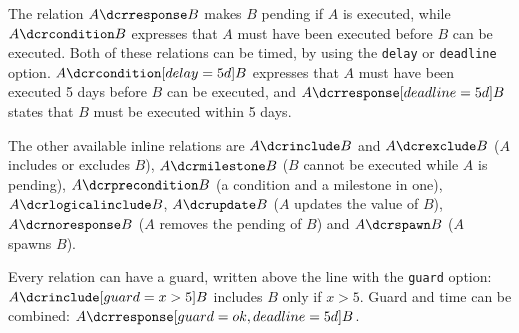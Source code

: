 The relation $A \dcrresponse B$ makes $B$ pending if $A$ is executed,
while $A \dcrcondition B$ expresses that $A$ must have been executed
before $B$ can be executed. Both of these relations can be timed, by
using the \texttt{delay} or \texttt{deadline} option.
$A \dcrcondition[delay=5d] B$ expresses that $A$ must have been executed
5 days before $B$ can be executed, and $A \dcrresponse[deadline=5d] B$
states that $B$ must be executed within 5 days.

The other available inline relations are $A \dcrinclude B$ and
$A \dcrexclude B$ ($A$ includes or excludes $B$), $A \dcrmilestone B$
($B$ cannot be executed while $A$ is pending), $A \dcrprecondition B$
(a condition and a milestone in one), $A \dcrlogicalinclude B$,
$A \dcrupdate B$ ($A$ updates the value of $B$), $A \dcrnoresponse B$
($A$ removes the pending of $B$) and $A \dcrspawn B$ ($A$ spawns $B$).

Every relation can have a guard, written above the line with the
\texttt{guard} option: $A \dcrinclude[guard={x > 5}] B$ includes $B$
only if $x > 5$. Guard and time can be combined:
$A \dcrresponse[guard=ok, deadline=5d] B$.
